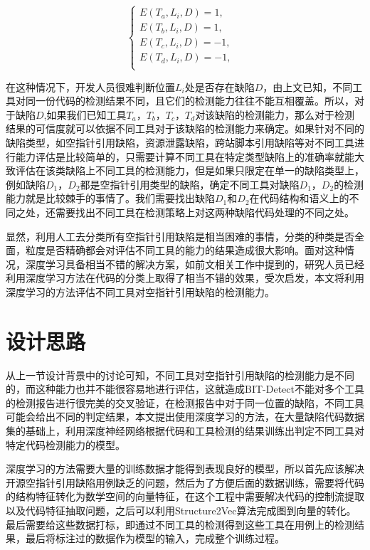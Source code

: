 \begin{equation}  
	\left\{  
	\begin{array}{lr}  
	E(T_{a},L_{i},D)=1, &  \\  
	E(T_{b},L_{i},D)=1, &  \\  
	E(T_{c},L_{i},D)=-1, &  \\  
	E(T_{d},L_{i},D)=-1, &  \\  
	\end{array}  
	\right.  
\end{equation} 

在这种情况下，开发人员很难判断位置$L_i$处是否存在缺陷$D$，由上文已知，不同工具对同一份代码的检测结果不同，且它们的检测能力往往不能互相覆盖。所以，对于缺陷$D$,如果我们已知工具$T_a$，$T_b$，$T_c$，$T_d$对该缺陷的检测能力，那么对于检测结果的可信度就可以依据不同工具对于该缺陷的检测能力来确定。如果针对不同的缺陷类型，如空指针引用缺陷，资源泄露缺陷，跨站脚本引用缺陷等对不同工具进行能力评估是比较简单的，只需要计算不同工具在特定类型缺陷上的准确率就能大致评估在该类缺陷上不同工具的检测能力，但是如果只限定在单一的缺陷类型上，例如缺陷$D_1$，$D_2$都是空指针引用类型的缺陷，确定不同工具对缺陷$D_1$，$D_2$的检测能力就是比较棘手的事情了。我们需要找出缺陷$D_1$和$D_2$在代码结构和语义上的不同之处，还需要找出不同工具在检测策略上对这两种缺陷代码处理的不同之处。

显然，利用人工去分类所有空指针引用缺陷是相当困难的事情，分类的种类是否全面，粒度是否精确都会对评估不同工具的能力的结果造成很大影响。面对这种情况，深度学习具备相当不错的解决方案，如前文相关工作中提到的，研究人员已经利用深度学习方法在代码的分类上取得了相当不错的效果，受次启发，本文将利用深度学习的方法评估不同工具对空指针引用缺陷的检测能力。

\section{设计思路}
从上一节设计背景中的讨论可知，不同工具对空指针引用缺陷的检测能力是不同的，而这种能力也并不能很容易地进行评估，这就造成BIT-Detect不能对多个工具的检测报告进行很完美的交叉验证，在检测报告中对于同一位置的缺陷，不同工具可能会给出不同的判定结果，本文提出使用深度学习的方法，在大量缺陷代码数据集的基础上，利用深度神经网络根据代码和工具检测的结果训练出判定不同工具对特定代码检测能力的模型。

深度学习的方法需要大量的训练数据才能得到表现良好的模型，所以首先应该解决开源空指针引用缺陷用例缺乏的问题，然后为了方便后面的数据训练，需要将代码的结构特征转化为数学空间的向量特征，在这个工程中需要解决代码的控制流提取以及代码特征抽取问题，之后可以利用Structure2Vec算法完成图到向量的转化。最后需要给这些数据打标，即通过不同工具的检测得到这些工具在用例上的检测结果，最后将标注过的数据作为模型的输入，完成整个训练过程。

